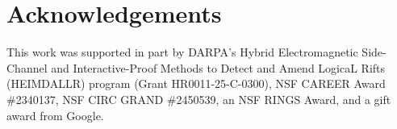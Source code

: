 \documentclass[10pt,conference]{IEEEtran}
\begin{document}
\maketitle







\section*{Acknowledgements}
This work was supported in part by DARPA’s Hybrid Electromagnetic Side-Channel and Interactive-Proof Methods to Detect and Amend LogicaL Rifts (HEIMDALLR) program (Grant HR0011-25-C-0300), NSF CAREER Award \#2340137, NSF CIRC GRAND \#2450539, an NSF RINGS Award, and a gift award from Google.





\end{document}
